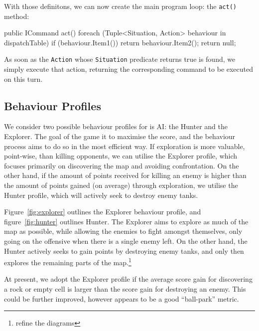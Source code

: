 \documentclass[11pt]{article}
\begin{document}
With those definitons, we can now create the main program loop: the \verb|act()| method:

\begin{code}
public ICommand act()
{
  foreach (Tuple<Situation, Action> behaviour in dispatchTable)
  {
    if (behaviour.Item1())
    {
      return behaviour.Item2();
    }
  }
  return null;
}
\end{code}

As soon as the \verb|Action| whose \verb|Situation| predicate returns true is found, we simply execute that action, returning the corresponding command to be executed on this turn.

\subsection{Behaviour Profiles} \label{sec:behaviourProfiles}

We consider two possible behaviour profiles for is AI: the Hunter and the Explorer. The goal of the game it to maximise the score, and the behaviour process aims to do so in the most efficient way. If exploration is more valuable, point-wise, than killing opponents, we can utilise the Explorer profile, which focuses primarily on discovering the map and avoiding confrontation. On the other hand, if the amount of points received for killing an enemy is higher than the amount of points gained (on average) through exploration, we utilise the Hunter profile, which will actively seek to destroy enemy tanks.

Figure~\ref{fig:explorer} outlines the Explorer behaviour profile, and figure~\ref{fig:hunter} outlines Hunter. The Explorer aims to explore as much of the map as possible, while allowing the enemies to fight amongst themselves, only going on the offensive when there is a single enemy left. On the other hand, the Hunter actively seeks to gain points by destroying enemy tanks, and only then explores the remaining parts of the map.\footnote{refine the diagrams}

At present, we adopt the Explorer profile if the average score gain for discovering a rock or empty cell is larger than the score gain for destroying an enemy. This could be further improved, however appears to be a good ``ball-park'' metric.
\end{document}
